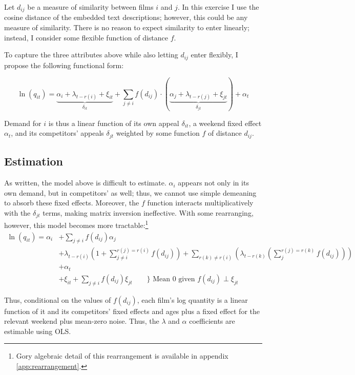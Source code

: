 \documentclass{article}
\begin{document}
Let $d_{ij}$ be a measure of similarity between films $i$ and $j$. In this exercise I use the cosine distance of the embedded text descriptions; however, this could be any measure of similarity. There is no reason to expect similarity to enter linearly; instead, I consider some flexible function of distance $f$. 

To capture the three attributes above while also letting $d_{ij}$ enter flexibly, I propose the following functional form:

$$\ln(q_{it}) = \underbrace{\alpha_i + \lambda_{t - r(i)} + \xi_{it}}_{\delta_{it}} + \sum_{j \neq i} f(d_{ij}) \cdot (\underbrace{\alpha_j + \lambda_{t - r(j)} + \xi_{jt}}_{\delta_{jt}}) + \alpha_t$$

Demand for $i$ is thus a linear function of its own appeal $\delta_{it}$, a weekend fixed effect $\alpha_t$, and its competitors' appeals $\delta_{jt}$ weighted by some function $f$ of distance $d_{ij}$. 

\subsection{Estimation}

As written, the model above is difficult to estimate. $\alpha_i$ appears not only in its own demand, but in competitors' as well; thus, we cannot use simple demeaning to absorb these fixed effects. Moreover, the $f$ function interacts multiplicatively with the $\delta_{jt}$ terms, making matrix inversion ineffective. With some rearranging, however, this model becomes more tractable:\footnote{Gory algebraic detail of this rearrangement is available in appendix \ref{app:rearrangement}.}
\begin{align*}
    \ln(q_{it}) = \alpha_i &+ \sum_{j \neq i} f(d_{ij}) \alpha_j \\
    &+ \lambda_{t - r(i)} \left(1 + \sum_{j \neq i}^{r(j) = r(i)} f(d_{ij})\right) + \sum_{r(k) \neq r(i)} \left(\lambda_{t - r(k)} \left(\sum_{j}^{r(j) = r(k)} f(d_{ij}) \right)\right) \\
    &+ \alpha_t \\
    &+ \xi_{it} + \sum_{j \neq i} f(d_{ij}) \xi_{jt} \qquad \bigg\} \text{ Mean 0 given $f(d_{ij}) \perp \xi_{jt}$}
\end{align*}

Thus, conditional on the values of $f(d_{ij})$, each film's log quantity is a linear function of it and its competitors' fixed effects and ages plus a fixed effect for the relevant weekend plus mean-zero noise. Thus, the $\lambda$ and $\alpha$ coefficients are estimable using OLS.
\end{document}
